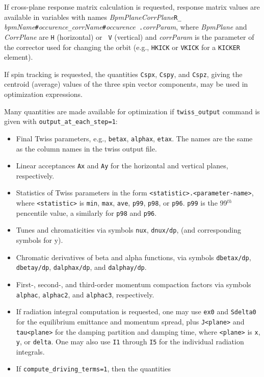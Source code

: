 \documentclass[11pt]{article}
\begin{document}
\begin{itemize}
If cross-plane response matrix calculation is requested, response matrix values
are available in variables with names {\em BpmPlane}{\em CorrPlane}{\tt R\_}{\em
bpmName}\verb|#|{\em occurence}{\tt \_}{\em corrName}\verb|#|{\em occurence}{\tt
.}{\em corrParam}, where {\em BpmPlane} and {\em CorrPlane} are  {\tt H} (horizontal) or {\tt
V} (vertical) and {\em corrParam} is the parameter of the corrector
used for changing the orbit (e.g., {\tt HKICK} or {\tt VKICK} for a
{\tt KICKER} element).

If spin tracking is requested, the quantities \verb|Cspx|, \verb|Cspy|, and \verb|Cspz|, giving
the centroid (average) values of the three spin vector components, may be used in optimization
expressions.

Many quantities are made available for optimization if \verb|twiss_output| command is given
with \verb|output_at_each_step=1|:
\begin{itemize} 
\item Final Twiss parameters, e.g., \verb|betax|, \verb|alphax|, \verb|etax|.  The names
are the same as the column names in the twiss output file.
\item Linear acceptances \verb|Ax| and \verb|Ay| for the horizontal and vertical planes, respectively.
\item Statistics of Twiss parameters in the form \verb|<statistic>.<parameter-name>|,
where \verb|<statistic>| is \verb|min|, \verb|max|, \verb|ave|, \verb|p99|, \verb|p98|, or
\verb|p96|.  \verb|p99| is the 99$^{th}$ pencentile value, a similarly for \verb|p98| and \verb|p96|.
\item Tunes and chromaticities via symbols \verb|nux|, \verb|dnux/dp|, (and corresponding
symbols for y).
\item Chromatic derivatives of beta and alpha functions, via symbols
\verb|dbetax/dp|, \verb|dbetay/dp|, \verb|dalphax/dp|, and \verb|dalphay/dp|.
\item First-, second-, and third-order momentum compaction factors via symbols \verb|alphac|, \verb|alphac2|, and
  \verb|alphac3|, respectively.
\item If radiation integral computation is requested,  one may use \verb|ex0| and \verb|Sdelta0| for
the equilibrium emittance and momentum spread, plus \verb|J<plane>|
and \verb|tau<plane>| for the damping partition and damping time,
where \verb|<plane>| is \verb|x|, \verb|y|, or \verb|delta|.  One may also use
\verb|I1| through \verb|I5| for the individual radiation integrals.
\item If \verb|compute_driving_terms=1|, then the quantities

\end{itemize}
\end{itemize}
\end{document}
